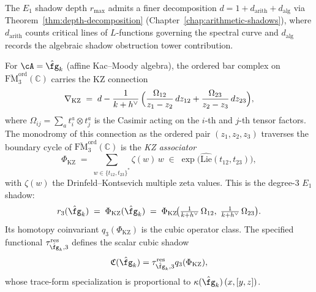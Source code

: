 \begin{remark}
\label{rem:e1-arithmetic-shadow-depth}
The $E_1$ shadow depth $r_{\max}$ admits a finer decomposition
$d = 1 + d_{\mathrm{arith}} + d_{\mathrm{alg}}$ via
Theorem~\textup{\ref{thm:depth-decomposition}}
(Chapter~\textup{\ref{chap:arithmetic-shadows}}),
where $d_{\mathrm{arith}}$ counts critical lines of $L$-functions
governing the spectral curve
and $d_{\mathrm{alg}}$ records the algebraic shadow obstruction tower contribution.
\end{remark}

\begin{construction}
\label{constr:kz-associator-e1-shadow}
\ClaimStatusProvedHere
{}
For $\cA = \hat\fg_k$ (affine Kac--Moody algebra), the ordered bar
complex on $\overline{\mathrm{FM}}_3^{\mathrm{ord}}(\mathbb{C})$
carries the KZ connection
\begin{equation}
\label{eq:kz-connection-bar}
\nabla_{\mathrm{KZ}}
\;=\;
d - \frac{1}{k+h^\vee}\,
\Bigl(
\frac{\Omega_{12}}{z_1-z_2}\,dz_{12}
+ \frac{\Omega_{23}}{z_2-z_3}\,dz_{23}
\Bigr),
\end{equation}
where $\Omega_{ij} = \sum_a t^a_i \otimes t^a_j$ is the Casimir
acting on the $i$-th and $j$-th tensor factors. The monodromy of
this connection as the ordered pair $(z_1, z_2, z_3)$ traverses the
boundary cycle of
$\overline{\mathrm{FM}}_3^{\mathrm{ord}}(\mathbb{C})$ is the
\emph{KZ associator}
\begin{equation}
\label{eq:kz-associator-monodromy}
\Phi_{\mathrm{KZ}}
\;=\;
\sum_{w \in \{t_{12}, t_{23}\}^*}
\zeta(w)\, w
\;\in\;
\exp\bigl(\widehat{\mathrm{Lie}}(t_{12}, t_{23})\bigr),
\end{equation}
with $\zeta(w)$ the Drinfeld--Kontsevich multiple zeta values.
This is the degree-$3$ $E_1$ shadow:
\begin{equation}
\label{eq:r3-kz}
r_3(\hat\fg_k)
\;=\;
\Phi_{\mathrm{KZ}}(\hat\fg_k)
\;=\;
\Phi_{\mathrm{KZ}}\!\bigl(
\tfrac{1}{k+h^\vee}\, \Omega_{12},\;
\tfrac{1}{k+h^\vee}\, \Omega_{23}
\bigr).
\end{equation}
Its homotopy coinvariant $q_3(\Phi_{\mathrm{KZ}})$ is the cubic
operator class.  The specified functional
$\tau_{\hat\fg_k,3}^{\mathrm{res}}$ defines the scalar cubic shadow
\[
 \mathfrak{C}(\hat\fg_k)
 =\tau_{\hat\fg_k,3}^{\mathrm{res}}q_3(\Phi_{\mathrm{KZ}}),
\]
whose trace-form specialization is proportional to
$\kappa(\hat\fg_k)\,(x,[y,z])$.
\end{construction}

